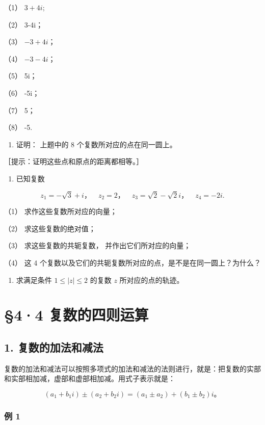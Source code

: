（1） \(3 + 4i;\)

（2） 3-4i；

（3） \(-3 + 4i\)；

（4） \(-3 - 4i\)；

（5） 5i；

（6） -5i；

（7） 5；

（8） -5.

\begin{enumerate}[start=2]
\item
  证明： 上题中的 8 个复数所对应的点在同一圆上。
\end{enumerate}

［提示：证明这些点和原点的距离都相等。］

\begin{enumerate}[start=3]
\item
  已知复数
\end{enumerate}

\[
z _ {1} = - \sqrt {3} + i\text{，} \quad z _ {2} = 2\text{，} \quad z _ {3} = \sqrt {2} - \sqrt {2} i\text{，} \quad z _ {4} = - 2 i.
\]

（1） 求作这些复数所对应的向量；

（2） 求这些复数的绝对值；

（3） 求这些复数的共轭复数， 并作出它们所对应的向量；

（4） 这 4
个复数以及它们的共轭复数所对应的点，是不是在同一圆上？为什么？

\begin{enumerate}
\item
  求满足条件 \(1 \leqslant |z| \leqslant 2\) 的复数 \(z\)
  所对应的点的轨迹。
\end{enumerate}

\section{§4·4 复数的四则运算}

\subsection{1. 复数的加法和减法}

复数的加法和减法可以按照多项式的加法和减法的法则进行，就是：把复数的实部和实部相加减，虚部和虚部相加减。用式子表示就是：

\[
(a_1+b_1i)\pm(a_2+b_2i)=(a_1\pm a_2)+(b_1\pm b_2)i\text{。}
\]

\subsubsection{例 1}

